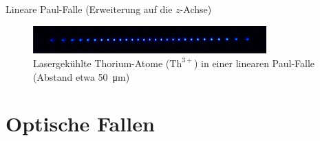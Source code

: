 \documentclass[12pt,xcolor=dvipsnames]{beamer}
\begin{document}
\begin{frame}{Lineare Paul-Falle (Erweiterung auf die $z$-Achse)}
	\vspace{0.2cm}
		
	\begin{figure}[h]
		\centering
		\includegraphics[width=0.8\textwidth]{./figures/29_laser_cooled_ion_chain.jpg}
		\caption{Lasergekühlte Thorium-Atome ($\mathrm{Th}^{3+}$) in einer linearen Paul-Falle (Abstand etwa \SI{50}{\micro\metre}) \cite{campbell}}
	\end{figure}
	
\end{frame}

%
%

\section{Optische Fallen}
\end{document}
